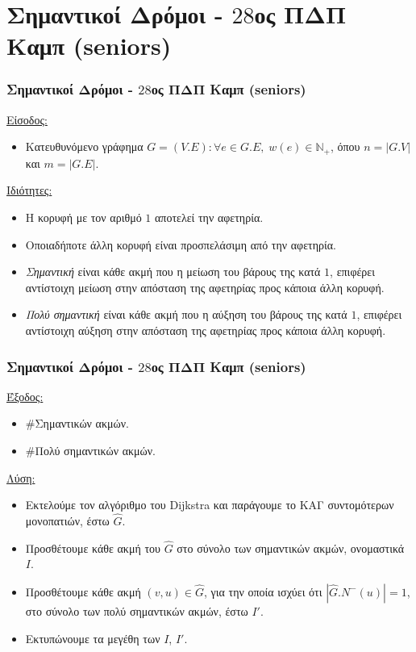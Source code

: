 \documentclass[t]{beamer}
\begin{document}
\section{Σημαντικοί Δρόμοι - $28$ος ΠΔΠ Καμπ (seniors)}

\begin{frame}
    \frametitle{Σημαντικοί Δρόμοι - $28$ος ΠΔΠ Καμπ (seniors)}
    \underline{Είσοδος:}
	\pause
	\vspace{0.25cm} 
	\begin{itemize}
		\item Κατευθυνόμενο γράφημα $G = \left(V.E\right) : \forall e \in G.E, \; w(e) \in \mathbb{N}_{+}$, όπου $n = |G.V|$ και $m = |G.E|$. 
	\end{itemize}
	\pause
	\vspace{0.25cm}
	\underline{Ιδιότητες:}
	\pause
	\vspace{0.25cm}
	\begin{itemize}
		\item Η κορυφή με τον αριθμό $1$ αποτελεί την αφετηρία.
		\pause
		\item Οποιαδήποτε άλλη κορυφή είναι προσπελάσιμη από την αφετηρία. 
		\pause
		\item \emph{Σημαντική} είναι κάθε ακμή που η μείωση του βάρους της κατά $1$, επιφέρει αντίστοιχη μείωση στην απόσταση της αφετηρίας προς κάποια άλλη κορυφή.
		\pause
		\item \emph{Πολύ σημαντική} είναι κάθε ακμή που η αύξηση του βάρους της κατά $1$, επιφέρει αντίστοιχη αύξηση στην απόσταση της αφετηρίας προς κάποια άλλη κορυφή.
	\end{itemize}
\end{frame}

\begin{frame}
	\frametitle{Σημαντικοί Δρόμοι - $28$ος ΠΔΠ Καμπ (seniors)}
	\underline{Έξοδος:}
	\pause
	\vspace{0.25cm} 
	\begin{itemize}
		\item $\#$Σημαντικών ακμών.
		\pause 
		\item $\#$Πολύ σημαντικών ακμών.
	\end{itemize}
	\pause
	\vspace{0.25cm} 
	\underline{Λύση:}
	\pause
	\vspace{0.25cm} 
	\begin{itemize}
		\item Εκτελούμε τον αλγόριθμο του Dijkstra και παράγουμε το ΚΑΓ συντομότερων μονοπατιών, έστω $\hat{G}$.
		\pause
		\item Προσθέτουμε κάθε ακμή του $\hat{G}$ στο σύνολο των σημαντικών ακμών, ονομαστικά $I$.
		\pause
		\item Προσθέτουμε κάθε ακμή $(v, u) \in \hat{G}$, για την οποία ισχύει ότι $\left|\hat{G}.N^-(u)\right| = 1$, στο σύνολο των πολύ σημαντικών ακμών, έστω $I'$.
		\pause
		\item Εκτυπώνουμε τα μεγέθη των $I$, $I'$.
	\end{itemize}
\end{frame}
\end{document}
